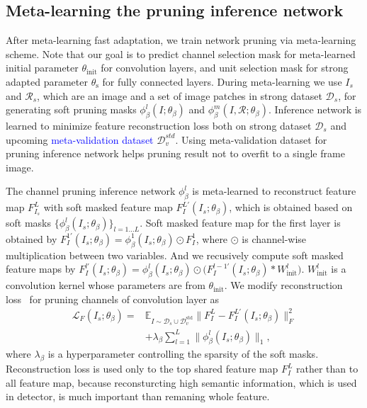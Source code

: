 \documentclass[letterpaper]{article} %
\begin{document}
\subsection{Meta-learning the pruning inference network}

After meta-learning fast adaptation, we train network pruning via meta-learning scheme. Note that our goal is to predict channel selection mask for meta-learned initial parameter $\theta_\text{init}$ for convolution layers, and unit selection mask for strong adapted parameter $\theta_\text{s}$ for fully connected layers.
During meta-learning we use $I_s$ and $\mathcal{R}_s$, which are an image and a set of image patches in strong dataset $\mathcal{D}_s$, for generating soft pruning masks $\phi^l_\beta(I;\theta_\beta)$ and $\phi^m_\beta(I,\mathcal{R};\theta_\beta)$.
Inference network is learned to minimize feature reconstruction loss both on strong dataset $\mathcal{D}_s$ and upcoming \textcolor{blue}{meta-validation dataset} $\mathcal{D}_v^{std}$.
Using meta-validation dataset for pruning inference network helps pruning result not to overfit to a single frame image.

The channel pruning inference network $\phi^l_\beta$ is meta-learned to reconstruct feature map $F^L_{I_s}$ with soft masked feature map $F^{L\prime}_I(I_s;\theta_\beta)$, which is obtained based on soft masks $\{\phi^l_\beta(I_s;\theta_\beta)\}_{l=1...L}$.
Soft masked feature map for the first layer is obtained by $F^{1\prime}_I(I_s;\theta_\beta)=\phi^1_\beta(I_s;\theta_\beta)\odot F^1_I$, where $\odot$ is channel-wise multiplication between two variables. And we recusively compute soft masked feature maps by
$F^{l\prime}_I(I_s;\theta_\beta)=\phi^l_\beta(I_s;\theta_\beta)\odot\big(F^{l-1\prime}_I(I_s;\theta_\beta)*W^l_\text{init}\big)$. $W^{l}_\text{init}$ is a convolution kernel whose parameters are from $\theta_\text{init}$.
We modify reconstruction loss~\cite{lassoprune} for pruning channels of convolution layer as
\begin{equation}\label{conv_prune_loss}
\begin{aligned}
\mathcal{L}_F(I_{s};\theta_{\beta}) =&  \mathbb{E}_{I\sim \mathcal{D}_s \cup \mathcal{D}_v^\text{std}}
    \big\lVert  F^{L}_I - F^{L\prime}_I(I_s;\theta_\beta) \big\rVert^{2}_{F} \\
&\textstyle+\lambda_{\beta} \sum_{l=1}^{L}\big\lVert \phi^l_\beta(I_s;\theta_\beta) \big\rVert_{1},
\end{aligned}
\end{equation}
where $\lambda_\beta$ is a hyperparameter controlling the sparsity of the soft masks.
Reconstruction loss is used only to the top shared feature map $F^L_I$ rather than to all feature map, because reconsturcting high semantic information, which is used in detector, is much important than remaning whole feature.
\end{document}
